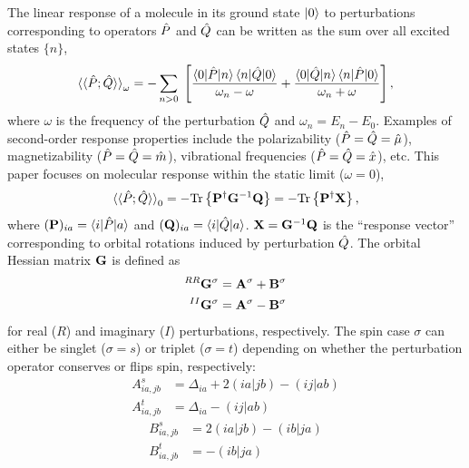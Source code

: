 \documentclass[%
  class = book,%
  crop = false,%
  float = true,%
  multi = true,%
  preview = false,%
]{standalone}
\let\cite\autocite
\begin{document}
The linear response of a molecule in its ground state \(\ket{0}\) to perturbations corresponding to operators \(\hat{P}\) and \(\hat{Q}\) can be written as the sum over all excited states \(\{n\}\),
\begin{equation}
  \braket{\braket{\hat{P}; \hat{Q}}}_{\omega}
  =
  - \sum_{n > 0} \;
    \left[
      \frac{\braket{0|\hat{P}|n} \braket{n|\hat{Q}|0}}{\omega_{n} - \omega}
    + \frac{\braket{0|\hat{Q}|n} \braket{n|\hat{P}|0}}{\omega_{n} + \omega}
    \right],
\end{equation}
where \(\omega\) is the frequency of the perturbation \(\hat{Q}\) and \(\omega_{n} = E_{n} - E_{0}\). Examples of second-order response properties include the polarizability (\(\hat{P} = \hat{Q} = \hat{\mu}\)), magnetizability (\(\hat{P} = \hat{Q} = \hat{m}\)), vibrational frequencies (\(\hat{P} = \hat{Q} = \hat{x}\)), etc. This paper focuses on molecular response within the static limit (\(\omega = 0\)),
\begin{equation}
  \braket{\braket{\hat{P}; \hat{Q}}}_{0}
  =
  - {\mathrm{Tr}}\left\{\mathbf{P}^{\dagger} \mathbf{G}^{-1} \mathbf{Q}\right\}
  =
  - {\mathrm{Tr}}\left\{\mathbf{P}^{\dagger} \mathbf{X}\right\},
\end{equation}
where \((\mathbf{P})_{ia} = \braket{i|\hat{P}|a}\) and \((\mathbf{Q})_{ia} = \braket{i|\hat{Q}|a}\). \(\mathbf{X} = \mathbf{G}^{-1} \mathbf{Q}\) is the ``response vector'' corresponding to orbital rotations induced by perturbation \(\hat{Q}\). The orbital Hessian matrix \(\mathbf{G}\) is defined as
\begin{equation}
  \begin{aligned}
    ^{RR}\mathbf{G}^{\sigma} &= \mathbf{A}^{\sigma} + \mathbf{B}^{\sigma} \\
    ^{II}\mathbf{G}^{\sigma} &= \mathbf{A}^{\sigma} - \mathbf{B}^{\sigma}
  \end{aligned}
\end{equation}
for real (\(R\)) and imaginary (\(I\)) perturbations, respectively\cite{doi:10.1080/00268976.2015.1024182}. The spin case \(\sigma\) can either be singlet (\(\sigma = s\)) or triplet (\(\sigma = t\)) depending on whether the perturbation operator conserves or flips spin, respectively:
\begin{equation}
  \label{eq:orbital-hessian-a}
  \begin{aligned}
    A^{s}_{ia,jb} &= \Delta_{ia} + 2(ia|jb) - (ij|ab) \\
    A^{t}_{ia,jb} &= \Delta_{ia} - (ij|ab)
  \end{aligned}
\end{equation}
\begin{equation}
  \label{eq:orbital-hessian-b}
  \begin{aligned}
    B^{s}_{ia,jb} &= 2(ia|jb) - (ib|ja) \\
    B^{t}_{ia,jb} &= - (ib|ja)
  \end{aligned}
\end{equation}
\end{document}
